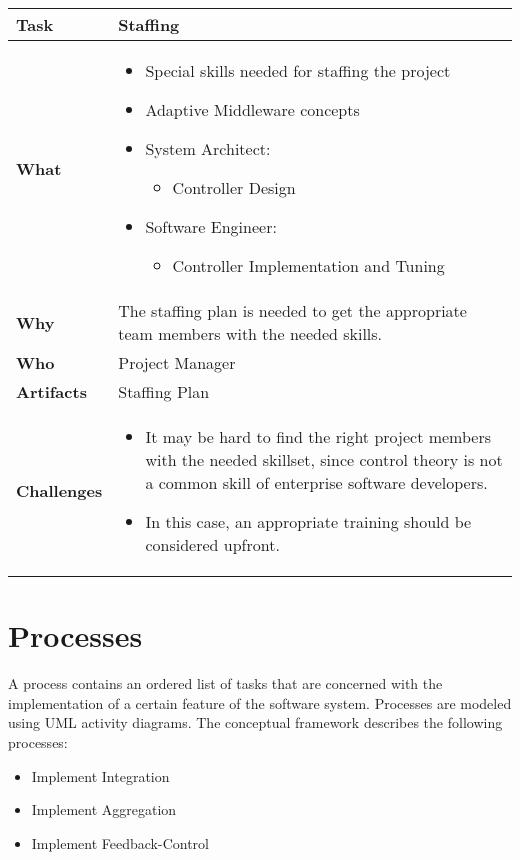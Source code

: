 \begin{tabularx}{\textwidth}{@{} l X @{}}
	\caption{Staffing} \label{table:ch6_Task_Staffing}\\
	\toprule 
	\bfseries Task & Staffing\\
	\midrule 
	\bfseries What & 
	\begin{itemize}
		\item Special skills needed for staffing the project
		\item Adaptive Middleware concepts
		\item System Architect:
		\begin{itemize}
			\item Controller Design
		\end{itemize}
		\item Software Engineer:
		\begin{itemize}
			\item Controller Implementation and Tuning
		\end{itemize}
	\end{itemize}
	\\
	\midrule 
	\bfseries Why & The staffing plan is needed to get the appropriate team members with the needed skills.\\
	\midrule 
	\bfseries Who & Project Manager\\
	\midrule 
	\bfseries Artifacts & Staffing Plan\\
	\midrule 
	\bfseries Challenges &
	\begin{itemize}
		\item It may be hard to find the right project members with the needed skillset, since control theory is not a common skill of enterprise software developers. 
		\item In this case, an appropriate training should be considered upfront.
	\end{itemize}
	\\
	\bottomrule 
\end{tabularx}

\section{Processes}
A process contains an ordered list of tasks that are concerned with the implementation of a certain feature of the software system.
Processes are modeled using \ac{UML} activity diagrams. The conceptual framework describes the following processes:
\begin{itemize}
	\item Implement Integration
	\item Implement Aggregation
	\item Implement Feedback-Control
\end{itemize}

